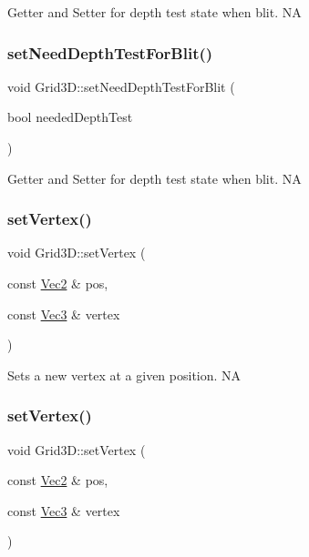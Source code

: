 Getter and Setter for depth test state when blit.  NA \mbox{\label{classGrid3D_a6d2d00afb35013a206d85b5cd298f781}} 
\subsubsection{\texorpdfstring{set\+Need\+Depth\+Test\+For\+Blit()}{setNeedDepthTestForBlit()}\hspace{0.1cm}{\footnotesize\ttfamily [2/2]}}
{\footnotesize\ttfamily void Grid3\+D\+::set\+Need\+Depth\+Test\+For\+Blit (\begin{DoxyParamCaption}\item[{bool}]{needed\+Depth\+Test }\end{DoxyParamCaption})\hspace{0.3cm}{\ttfamily [inline]}}

Getter and Setter for depth test state when blit.  NA \mbox{\label{classGrid3D_a7612c4071bf59e12edb5107eb8f8332f}} 
\subsubsection{\texorpdfstring{set\+Vertex()}{setVertex()}\hspace{0.1cm}{\footnotesize\ttfamily [1/2]}}
{\footnotesize\ttfamily void Grid3\+D\+::set\+Vertex (\begin{DoxyParamCaption}\item[{const \hyperlink{classVec2}{Vec2} \&}]{pos,  }\item[{const \hyperlink{classVec3}{Vec3} \&}]{vertex }\end{DoxyParamCaption})}

Sets a new vertex at a given position.  NA \mbox{\label{classGrid3D_a7612c4071bf59e12edb5107eb8f8332f}} 
\subsubsection{\texorpdfstring{set\+Vertex()}{setVertex()}\hspace{0.1cm}{\footnotesize\ttfamily [2/2]}}
{\footnotesize\ttfamily void Grid3\+D\+::set\+Vertex (\begin{DoxyParamCaption}\item[{const \hyperlink{classVec2}{Vec2} \&}]{pos,  }\item[{const \hyperlink{classVec3}{Vec3} \&}]{vertex }\end{DoxyParamCaption})}

